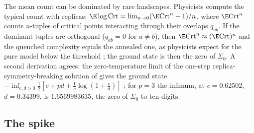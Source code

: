 \begin{refsection}
The mean count can be dominated by rare landscapes. Physicists compute the typical count with replicas: $\E\log\kacriceCrt=\lim_{n\to0}(\E\kacriceCrt^n-1)/n$, where $\E\kacriceCrt^n$ counts $n$-tuples of critical points interacting through their overlaps $q_{ab}$. If the dominant tuples are orthogonal ($q_{ab}=0$ for $a\ne b$), then $\E\kacriceCrt^n\approx(\E\kacriceCrt)^n$ and the quenched complexity equals the annealed one, as physicists expect for the pure model below the threshold \parencite{CrisantiSommers1995}; the ground state is then the zero of $\Sigma_0$. A second derivation agrees: the zero-temperature limit of the one-step replica-symmetry-breaking solution of \textcite{CrisantiSommers1992} gives the ground state $-\inf_{c,d>0}\frac12[c+pd+\frac1c\log(1+\frac cd)]$ \parencite[eq.~(5.11)]{AuffingerBenArousCerny2013}; for $p=3$ the infimum, at $c=0.62502$, $d=0.34399$, is $1.6569983635$, the zero of $\Sigma_0$ to ten digits.

\subsection{The spike}\label{sec:kacrice:spike-physics}


\end{refsection}
